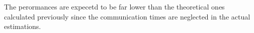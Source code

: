 The perormances are expecetd to be far lower than the theoretical ones calculated previously since the communication times are neglected in the actual estimations. 
